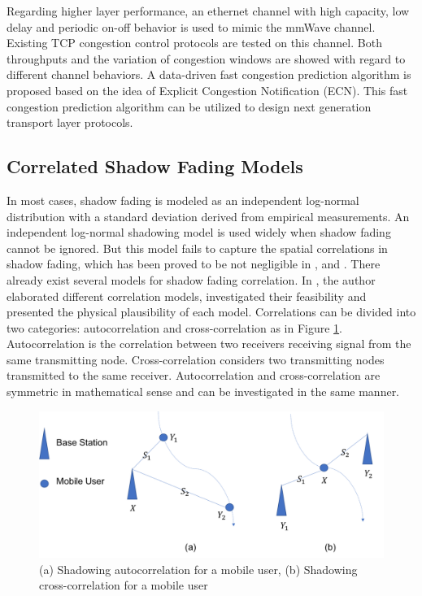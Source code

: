 \par Regarding higher layer performance, an ethernet channel with high capacity, low delay and periodic on-off behavior is used to mimic the mmWave channel. Existing TCP congestion control protocols are tested on this channel. Both throughputs and the variation of congestion windows are showed with regard to different channel behaviors. A data-driven fast congestion prediction algorithm is proposed based on the idea of Explicit Congestion Notification (ECN). This fast congestion prediction algorithm can be utilized to design next generation transport layer protocols.
\subsection{Correlated Shadow Fading Models}
\par In most cases, shadow fading is modeled as an independent log-normal distribution \cite{goldsmith2005wireless} with a standard deviation derived from empirical measurements. An independent log-normal shadowing model is used widely when shadow fading cannot be ignored. But this model fails to capture the spatial correlations in shadow fading, which has been proved to be not negligible in \cite{graziano1978propagation}, \cite{marsan1990shadowing} and \cite{liberti1992statistics}. There already exist several models for shadow fading correlation. In \cite{szyszkowicz2010feasibility}, the author elaborated different correlation models, investigated their feasibility and presented the physical plausibility of each model. Correlations can be divided into two categories: autocorrelation and cross-correlation as in Figure \ref{correlation}. Autocorrelation is the correlation between two receivers receiving signal from the same transmitting node. Cross-correlation considers two transmitting nodes transmitted to the same receiver. Autocorrelation and cross-correlation are symmetric in mathematical sense and can be investigated in the same manner.
\begin{figure} 
\centering
\includegraphics[width=14cm]{correlation.png}
\caption{(a) Shadowing autocorrelation for a mobile user, (b) Shadowing cross-correlation for a mobile user}
\label{correlation}
\end{figure}
